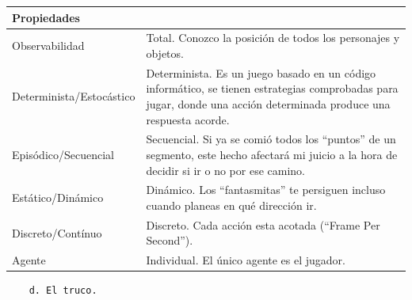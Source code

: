 \documentclass[11pt]{article}
\begin{document}
\begin{longtable}[]{@{}
  >{\raggedright\arraybackslash}p{}
  >{\raggedright\arraybackslash}p{}@{}}
\toprule\noalign{}
\begin{minipage}[b]{\linewidth}\raggedright
Propiedades
\end{minipage} & \begin{minipage}[b]{\linewidth}\raggedright
\end{minipage} \\
\midrule\noalign{}
\endhead
\bottomrule\noalign{}
\endlastfoot
Observabilidad & Total. Conozco la posición de todos los personajes y
objetos. \\
Determinista/Estocástico & Determinista. Es un juego basado en un código
informático, se tienen estrategias comprobadas para jugar, donde una
acción determinada produce una respuesta acorde. \\
Episódico/Secuencial & Secuencial. Si ya se comió todos los ``puntos''
de un segmento, este hecho afectará mi juicio a la hora de decidir si ir
o no por ese camino. \\
Estático/Dinámico & Dinámico. Los ``fantasmitas'' te persiguen incluso
cuando planeas en qué dirección ir. \\
Discreto/Contínuo & Discreto. Cada acción esta acotada (``Frame Per
Second''). \\
Agente & Individual. El único agente es el jugador. \\
\end{longtable}

\begin{verbatim}
    d. El truco.
\end{verbatim}
\end{document}

